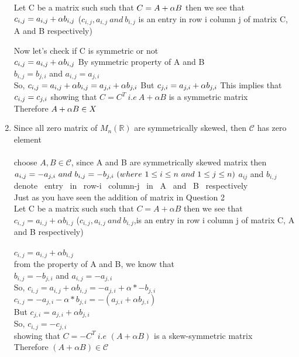 \documentclass[45pt]{article}
\begin{document}
\begin{enumerate}
Let C be a matrix such such that 
$C= A+ \alpha B \\$ then we see that 
$c_{i,j}=a_{i,j}+\alpha b_{i,j} \\$
($ c_{i,j},a_{i,j}~ and ~b_{i,j} $ is an entry in row i column j of matrix C, A and B respectively)

Now let's check if C is symmetric or not\\
$c_{i,j}=a_{i,j}+\alpha b_{i,j}\\ $
By symmetric property of A and B\\ $b_{i,j}=b_{j,i}$ and $a_{i,j}=a_{j,i}$\\
So, $c_{i,j}=a_{i,j}+\alpha b_{i,j} =a_{j,i}+\alpha b_{j,i}\\$ 
But $c_{j,i} =a_{j,i}+\alpha b_{j,i}\\$
This implies that $c_{i,j}=c_{j,i}\\$
showing that $C=C^T ~i.e~ A+ \alpha B$ is a symmetric matrix \\
Therefore $A+ \alpha B  \in X\\$


\item Since all zero matrix of $M_n(\mathbb{R}) $ are symmetrically skewed, then $\mathcal{C}$  has zero element\\
 \\ 

choose $A, B \in \mathcal{C} $, since A and B are symmetrically skewed matrix then 
$ a_{i,j}=-a_{j,i} ~ and ~ b_{i,j}=-b_{j,i} ~ (where ~ 1 \leq i \leq n ~and ~1 \leq j \leq n )\\$
$a_{ij}$ and $b_{i,j}$~ denote~ entry~ in~ row-i ~column-j ~in ~A~ and ~B~ respectively\\

Just as you have seen the addition of matrix in Question 2\\
Let C be a matrix such such that 
$C= A+ \alpha B $ then we see that \\
$c_{i,j}=a_{i,j}+\alpha b_{i,j} $
($ c_{i,j},a_{i,j}~ and ~b_{i,j} $,is an entry in row i column j of matrix C, A and B respectively)\\

\\
$c_{i,j}=a_{i,j}+\alpha b_{i,j} $\\
from the property of A and B, we know that \\
$b_{i,j}=-b_{j,i}$ and $a_{i,j}=-a_{j,i}$\\
So, $c_{i,j}=a_{i,j}+\alpha b_{i,j} =-a_{j,i}+\alpha *-b_{j,i}$\\
$c_{i,j}=-a_{j,i}-\alpha *b_{j,i}=-(a_{j,i}+\alpha b_{j,i})$ \\
But $c_{j,i} =a_{j,i}+\alpha b_{j,i}$\\
So, $c_{i,j}=-c_{j,i}$\\
showing that $C=-C^T ~i.e $ $ (A+ \alpha B)$ is a skew-symmetric  matrix \\
Therefore $(A+ \alpha B)  \in \mathcal{C}$\\



\end{enumerate}
\end{document}
